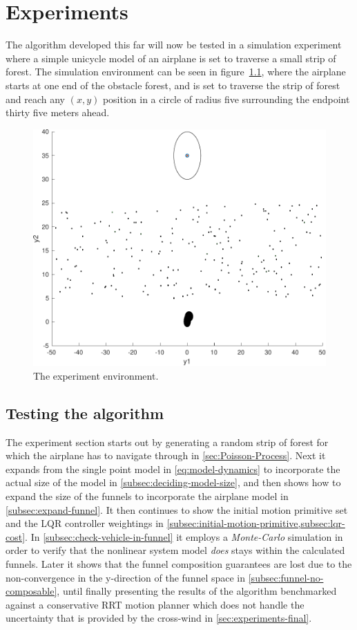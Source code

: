 \chapter{Experiments}
\label{chp:experiments}

The \rrtfunnel{} algorithm developed this far will now be tested in a simulation
experiment where a simple unicycle model of an airplane is set to traverse a
small strip of forest. The simulation environment can be seen in
figure~\cref{fig:simulated-forest}, where the airplane starts at one end of the
obstacle forest, and is set to traverse the strip of forest and reach any
\((x,y)\) position in a circle of radius five surrounding the endpoint thirty
five meters ahead.

\begin{figure}
  \centering
  \includegraphics[width=.8\textwidth]{figures/experiments/simulated-forest} \caption{The
    experiment environment.}
  \label{fig:simulated-forest}
\end{figure}

\section{Testing the \rrtfunnel{} algorithm}

The experiment section starts out by generating a random strip of forest for
which the airplane has to navigate through in \cref{sec:Poisson-Process}. Next
it expands from the single point model in \cref{eq:model-dynamics} to
incorporate the actual size of the model in \cref{subsec:deciding-model-size},
and then shows how to expand the size of the funnels to incorporate the airplane
model in \cref{subsec:expand-funnel}. It then continues to show the initial
motion primitive set and the \ac{LQR} controller weightings in
\cref{subsec:initial-motion-primitive,subsec:lqr-cost}. In
\cref{subsec:check-vehicle-in-funnel} it employs a \textit{Monte-Carlo}
simulation in order to verify that the nonlinear system model \textit{does}
stays within the calculated funnels. Later it shows that the funnel composition
guarantees are lost due to the non-convergence in the y-direction of the funnel
space in \cref{subsec:funnel-no-composable}, until finally presenting the
results of the \rrtfunnel{} algorithm benchmarked against a conservative
\ac{RRT} motion planner which does not handle the uncertainty that is provided
by the cross-wind in \cref{sec:experiments-final}.

